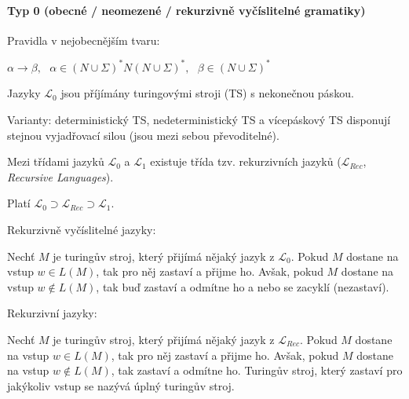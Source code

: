 \paragraph*{Typ 0 (obecné / neomezené / rekurzivně vyčíslitelné gramatiky)} \begin{compactitem}
    \item Pravidla v nejobecnějším tvaru: \begin{compactitem}
        \item $\alpha \rightarrow \beta,~~~ \alpha \in (N \cup \Sigma)^* N (N \cup \Sigma)^*,~~~ \beta \in (N \cup \Sigma)^*$
    \end{compactitem}

    \item Jazyky $\mathcal{L}_0$ jsou příjímány turingovými stroji (TS) s nekonečnou páskou. \begin{compactitem}
        \item Varianty: deterministický TS, nedeterministický TS a vícepáskový TS disponují stejnou vyjadřovací silou (jsou mezi sebou převoditelné).
    \end{compactitem}

    \item Mezi třídami jazyků $\mathcal{L}_0$ a $\mathcal{L}_1$ existuje třída tzv. rekurzivních jazyků ($\mathcal{L}_{Rec}$, \textit{Recursive Languages}). \begin{compactitem}
        \item Platí $\mathcal{L}_0 \supset \mathcal{L}_{Rec} \supset \mathcal{L}_1$.

        \item Rekurzivně vyčíslitelné jazyky: \begin{compactitem}
            \item Nechť $M$ je turingův stroj, který přijímá nějaký jazyk z $\mathcal{L}_0$. Pokud $M$ dostane na vstup $w \in L(M)$, tak pro něj zastaví a přijme ho. Avšak, pokud $M$ dostane na vstup $w \not\in L(M)$, tak buď zastaví a odmítne ho a nebo se zacyklí (nezastaví).
        \end{compactitem}

        \item Rekurzivní jazyky: \begin{compactitem}
            \item Nechť $M$ je turingův stroj, který přijímá nějaký jazyk z $\mathcal{L}_{Rec}$. Pokud $M$ dostane na vstup $w \in L(M)$, tak pro něj zastaví a přijme ho. Avšak, pokud $M$ dostane na vstup $w \not\in L(M)$, tak zastaví a odmítne ho. Turingův stroj, který zastaví pro jakýkoliv vstup se nazývá úplný turingův stroj.
        \end{compactitem}
    \end{compactitem}


\end{compactitem}
